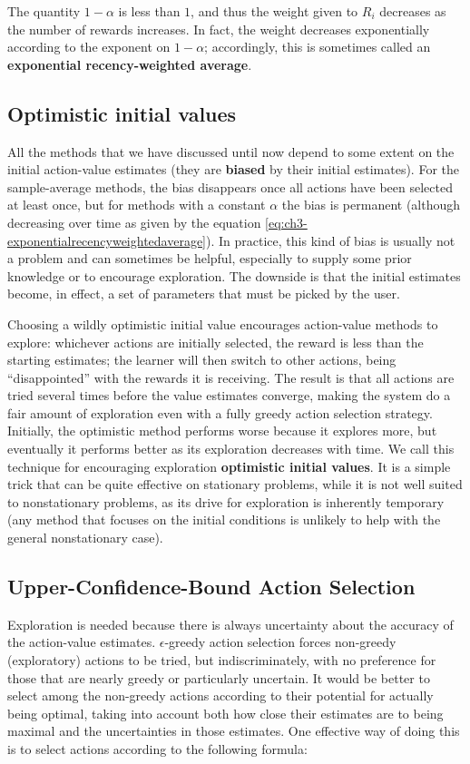 The quantity $1 - \alpha$ is less than $1$, and thus the weight given to $R_i$ decreases as the number of rewards increases. In fact, the weight decreases exponentially according to the exponent on $1 - \alpha$; accordingly, this is sometimes called an \textbf{exponential recency-weighted average}.

\subsection{Optimistic initial values}
All the methods that we have discussed until now depend to some extent on the initial action-value estimates (they are \textbf{biased} by their initial estimates). For the sample-average methods, the bias disappears once all actions have been selected at least once, but for methods with a constant $\alpha$ the bias is permanent (although decreasing over time as given by the equation \eqref{eq:ch3-exponentialrecencyweightedaverage}). In practice, this kind of bias is usually not a problem and can sometimes be helpful, especially to supply some prior knowledge or to encourage exploration. The downside is that the initial estimates become, in effect, a set of parameters that must be picked by the user.

Choosing a wildly optimistic initial value encourages action-value methods to explore: whichever actions are initially selected, the reward is less than the starting estimates; the learner will then switch to other actions, being ``disappointed'' with the rewards it is receiving. The result is that all actions are tried several times before the value estimates converge, making the system do a fair amount of exploration even with a fully greedy action selection strategy. Initially, the optimistic method performs worse because it explores more, but eventually it performs better as its exploration decreases with time. We call this technique for encouraging exploration \textbf{optimistic initial values}. It is a simple trick that can be quite effective on stationary problems, while it is not well suited to nonstationary problems, as its drive for exploration is inherently temporary (any method that focuses on the initial conditions is unlikely to help with the general nonstationary case).

\subsection{Upper-Confidence-Bound Action Selection}
Exploration is needed because there is always uncertainty about the accuracy of the action-value estimates. $\epsilon$-greedy action selection forces non-greedy (exploratory) actions to be tried, but indiscriminately, with no preference for those that are nearly greedy or particularly uncertain. It would be better to select among the non-greedy actions according to their potential for actually being optimal, taking into account both how close their estimates are to being maximal and the uncertainties in those estimates. One effective way of doing this is to select actions according to the following formula:

